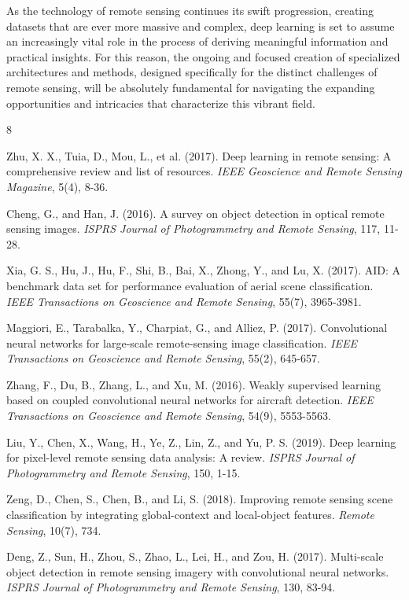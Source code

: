 \documentclass[12pt,a4paper]{article}
\begin{document}
As the technology of remote sensing continues its swift progression, creating datasets that are ever more massive and complex, deep learning is set to assume an increasingly vital role in the process of deriving meaningful information and practical insights. For this reason, the ongoing and focused creation of specialized architectures and methods, designed specifically for the distinct challenges of remote sensing, will be absolutely fundamental for navigating the expanding opportunities and intricacies that characterize this vibrant field.



\begin{thebibliography}{8}

Zhu, X. X., Tuia, D., Mou, L., et al. (2017). Deep learning in remote sensing: A comprehensive review and list of resources. \emph{IEEE Geoscience and Remote Sensing Magazine}, 5(4), 8-36.

Cheng, G., and Han, J. (2016). A survey on object detection in optical remote sensing images. \emph{ISPRS Journal of Photogrammetry and Remote Sensing}, 117, 11-28.

Xia, G. S., Hu, J., Hu, F., Shi, B., Bai, X., Zhong, Y., and Lu, X. (2017). AID: A benchmark data set for performance evaluation of aerial scene classification. \emph{IEEE Transactions on Geoscience and Remote Sensing}, 55(7), 3965-3981.

Maggiori, E., Tarabalka, Y., Charpiat, G., and Alliez, P. (2017). Convolutional neural networks for large-scale remote-sensing image classification. \emph{IEEE Transactions on Geoscience and Remote Sensing}, 55(2), 645-657.

Zhang, F., Du, B., Zhang, L., and Xu, M. (2016). Weakly supervised learning based on coupled convolutional neural networks for aircraft detection. \emph{IEEE Transactions on Geoscience and Remote Sensing}, 54(9), 5553-5563.

Liu, Y., Chen, X., Wang, H., Ye, Z., Lin, Z., and Yu, P. S. (2019). Deep learning for pixel-level remote sensing data analysis: A review. \emph{ISPRS Journal of Photogrammetry and Remote Sensing}, 150, 1-15.

Zeng, D., Chen, S., Chen, B., and Li, S. (2018). Improving remote sensing scene classification by integrating global-context and local-object features. \emph{Remote Sensing}, 10(7), 734.

Deng, Z., Sun, H., Zhou, S., Zhao, L., Lei, H., and Zou, H. (2017). Multi-scale object detection in remote sensing imagery with convolutional neural networks. \emph{ISPRS Journal of Photogrammetry and Remote Sensing}, 130, 83-94.

\end{thebibliography}
\end{document}
